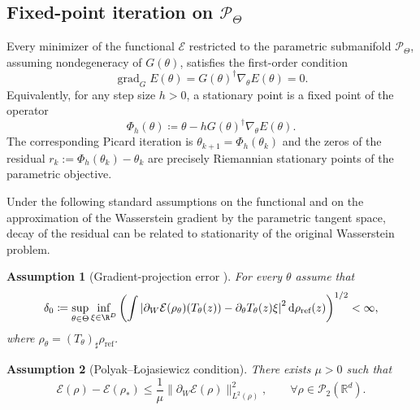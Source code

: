 \documentclass{article} %
\newtheorem{assumption}{Assumption}[section]
\numberwithin{equation}{subsection}
\numberwithin{theorem}{section}
\newcommand{\dd}{\mathrm{d}}
\newcommand{\cE}{\mathcal{E}}
\newcommand{\rhoref}{{\rho_{\text{ref}}}}
\newcommand{\Wspace}{\mathcal{P}_2(\mathbb{R}^d)}
\newcommand{\PWspace}{\mathcal{P}_\Theta}
\begin{document}
\subsection{Fixed-point iteration on $\PWspace$}
\label{subsec:fixed_point_iteration_parametric_space}

Every minimizer of the functional $\cE$ restricted to the parametric
submanifold $\PWspace$, assuming nondegeneracy of $G(\theta)$, satisfies the
first-order condition
\[
    \operatorname{grad}_G E(\theta)=G(\theta)^\dagger\nabla_\theta E(\theta)=0.
\]
Equivalently, for any step size $h>0$, a stationary point is a fixed point of
the operator 
\begin{equation}\label{eq:Phi}
    \Phi_h(\theta)
    \coloneqq 
    \theta-hG(\theta)^\dagger\nabla_\theta E(\theta).
\end{equation}
The corresponding Picard iteration is
$\theta_{k+1}
    =
    \Phi_h(\theta_k)$
and the zeros of the residual $r_k := \Phi_h(\theta_k)-\theta_k$ are precisely Riemannian stationary points of the parametric objective.

Under the following standard assumptions on the functional and on the approximation of
the Wasserstein gradient by the parametric tangent space, decay of the residual
can be related to stationarity of the original Wasserstein problem.

\begin{assumption}[Gradient-projection error {\cite[Definition~3.6]{jin_parameterized_2025}}]
\label{asmp:gradd_error_bound}
For every $\theta$ assume that
\begin{equation}\label{eq:projection_error_assumption}
    \delta_0
    \coloneqq 
    \sup_{\theta\in\Theta}
    \inf_{\xi\in\R^D}
    \left(
    \int
    \left|
        \partial_W\cE(\rho_\theta)(T_\theta(z))
        -
        \partial_\theta T_\theta(z)\xi
    \right|^2
    \dd\rhoref(z)
    \right)^{1/2}
    <
    \infty,
\end{equation}
where $\rho_\theta=(T_\theta)_\sharp\rhoref$.
\end{assumption}

\begin{assumption}[Polyak--{\L}ojasiewicz condition]
\label{asmp:polyak-lojasiewicz}
There exists $\mu>0$ such that
\begin{equation}\label{eq:polyak_lojasievicz}
    \cE(\rho)-\cE(\rho_*)
    \leq
    \frac{1}{\mu}
    \|\partial_W\cE(\rho)\|^2_{L^2(\rho)},
    \qquad
    \forall \rho\in\Wspace .
\end{equation}
\end{assumption}
\end{document}
